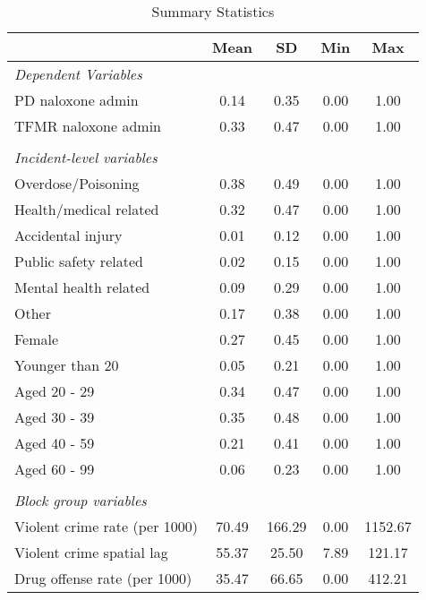 \begin{table}[htbp]\centering
\def\sym#1{\ifmmode^{#1}\else\(^{#1}\)\fi}
\caption{\centering Summary Statistics}
\begin{tabular}{l*{1}{cccc}}
\toprule
                &     Mean&       SD&      Min&      Max\\
\midrule
\emph{Dependent Variables}&         &         &         &         \\
PD naloxone admin&     0.14&     0.35&     0.00&     1.00\\
TFMR naloxone admin&     0.33&     0.47&     0.00&     1.00\\
\vspace{.05em} \\
\emph{Incident-level variables}&         &         &         &         \\
Overdose/Poisoning&     0.38&     0.49&     0.00&     1.00\\
Health/medical related&     0.32&     0.47&     0.00&     1.00\\
Accidental injury&     0.01&     0.12&     0.00&     1.00\\
Public safety related&     0.02&     0.15&     0.00&     1.00\\
Mental health related&     0.09&     0.29&     0.00&     1.00\\
Other           &     0.17&     0.38&     0.00&     1.00\\
Female          &     0.27&     0.45&     0.00&     1.00\\
Younger than 20 &     0.05&     0.21&     0.00&     1.00\\
Aged 20 - 29    &     0.34&     0.47&     0.00&     1.00\\
Aged 30 - 39    &     0.35&     0.48&     0.00&     1.00\\
Aged 40 - 59    &     0.21&     0.41&     0.00&     1.00\\
Aged 60 - 99    &     0.06&     0.23&     0.00&     1.00\\
\vspace{.05em} \\
\emph{Block group variables}&         &         &         &         \\
Violent crime rate (per 1000)&    70.49&   166.29&     0.00&  1152.67\\
Violent crime spatial lag&    55.37&    25.50&     7.89&   121.17\\
Drug offense rate (per 1000)&    35.47&    66.65&     0.00&   412.21\\

\end{tabular}
\end{table}

